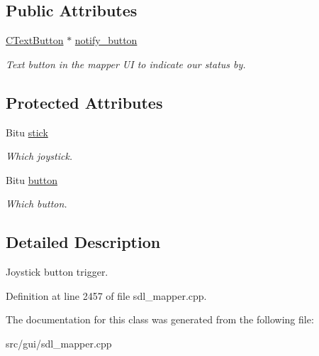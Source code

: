 \subsection*{Public Attributes}
\begin{DoxyCompactItemize}
\item 
\hypertarget{classCJButtonEvent_ac8c89511fdc9a86b4c187eec432445d2}{\hyperlink{classCTextButton}{C\-Text\-Button} $\ast$ \hyperlink{classCJButtonEvent_ac8c89511fdc9a86b4c187eec432445d2}{notify\-\_\-button}}\label{classCJButtonEvent_ac8c89511fdc9a86b4c187eec432445d2}

\begin{DoxyCompactList}\small\item\em Text button in the mapper U\-I to indicate our status by. \end{DoxyCompactList}\end{DoxyCompactItemize}
\subsection*{Protected Attributes}
\begin{DoxyCompactItemize}
\item 
\hypertarget{classCJButtonEvent_aa87062af5d8bc5db801066e2eb4a74f8}{Bitu \hyperlink{classCJButtonEvent_aa87062af5d8bc5db801066e2eb4a74f8}{stick}}\label{classCJButtonEvent_aa87062af5d8bc5db801066e2eb4a74f8}

\begin{DoxyCompactList}\small\item\em Which joystick. \end{DoxyCompactList}\item 
\hypertarget{classCJButtonEvent_abdbfaa23915b89b1392129c9525dd58d}{Bitu \hyperlink{classCJButtonEvent_abdbfaa23915b89b1392129c9525dd58d}{button}}\label{classCJButtonEvent_abdbfaa23915b89b1392129c9525dd58d}

\begin{DoxyCompactList}\small\item\em Which button. \end{DoxyCompactList}\end{DoxyCompactItemize}


\subsection{Detailed Description}
Joystick button trigger. 

Definition at line 2457 of file sdl\-\_\-mapper.\-cpp.



The documentation for this class was generated from the following file\-:\begin{DoxyCompactItemize}
\item 
src/gui/sdl\-\_\-mapper.\-cpp\end{DoxyCompactItemize}
